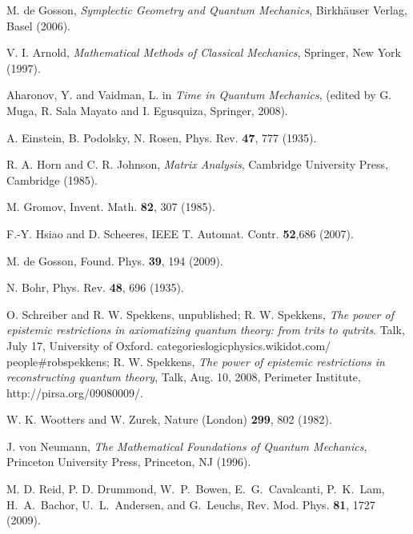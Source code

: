 \documentclass[pra,superscriptaddress,nofootinbib,12pt]{revtex4-2}
\begin{document}
\begin{thebibliography}{9}
 M. de Gosson, \textit{Symplectic Geometry and Quantum Mechanics}, Birkh\"{a}user Verlag, Basel (2006).

 V. I. Arnold, \textit{Mathematical Methods of Classical Mechanics}, Springer, New York (1997).


 Aharonov, Y. and Vaidman, L. in
\textit{Time in Quantum Mechanics}, (edited by G. Muga, R. Sala Mayato and I. Egusquiza, Springer, 2008).

  A. Einstein, B. Podolsky, N. Rosen, Phys. Rev. \textbf{47}, 777 (1935).

 R. A. Horn and C. R. Johnson, \textit{Matrix Analysis}, Cambridge University Press, Cambridge (1985).

 M. Gromov, Invent. Math. \textbf{82}, 307 (1985).

  F.-Y. Hsiao and D. Scheeres, IEEE T. Automat. Contr. \textbf{52},686 (2007).

 M. de Gosson, Found. Phys. \textbf{39}, 194 (2009).

 N. Bohr, Phys. Rev. \textbf{48}, 696 (1935).

 O. Schreiber and R. W. Spekkens, unpublished; R. W. Spekkens, \textit{The power of epistemic restrictions in axiomatizing quantum theory: from trits to qutrits}. Talk, July
17, University of Oxford. categorieslogicphysics.wikidot.com/ people\#robspekkens; R. W. Spekkens, \textit{The power of epistemic restrictions in reconstructing quantum theory}, Talk, Aug. 10, 2008, Perimeter Institute, http://pirsa.org/09080009/.

 W. K. Wootters and W. Zurek, Nature (London) \textbf{299}, 802 (1982).

 J. von Neumann, \textit{The Mathematical Foundations of Quantum Mechanics}, Princeton University Press, Princeton, NJ (1996).


 M. D. Reid, P. D. Drummond, W.\ P.\ Bowen, E.\ G.\ Cavalcanti, P.\ K.\ Lam, H.\ A.\ Bachor, U.\ L.\ Andersen, and G.\ Leuchs, Rev. Mod. Phys. \textbf{81}, 1727 (2009).




\end{thebibliography}
\end{document}
